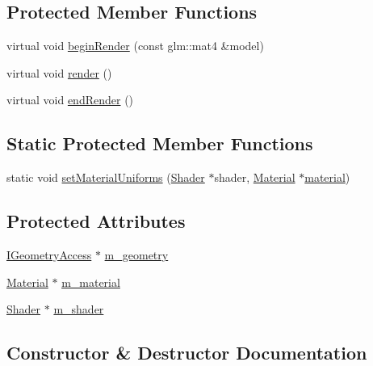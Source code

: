 \subsection*{Protected Member Functions}
\begin{DoxyCompactItemize}
\item 
virtual void \mbox{\hyperlink{classec_1_1_drawable_a9cb72c1eda19a82c849a291e7d45f2b8}{begin\+Render}} (const glm\+::mat4 \&model)
\item 
virtual void \mbox{\hyperlink{classec_1_1_drawable_a7da17eae29c09e49d1a8c2c48e85f88a}{render}} ()
\item 
virtual void \mbox{\hyperlink{classec_1_1_drawable_abf99119cd72054a55d91a7605aa62e32}{end\+Render}} ()
\end{DoxyCompactItemize}
\subsection*{Static Protected Member Functions}
\begin{DoxyCompactItemize}
\item 
static void \mbox{\hyperlink{classec_1_1_drawable_af2b64f8e6faa71bee8cccb14387d8432}{set\+Material\+Uniforms}} (\mbox{\hyperlink{classec_1_1_shader}{Shader}} $\ast$shader, \mbox{\hyperlink{classec_1_1_material}{Material}} $\ast$\mbox{\hyperlink{_resource_type_8h_a16f6cac2c88eef38bdba4f004e042542}{material}})
\end{DoxyCompactItemize}
\subsection*{Protected Attributes}
\begin{DoxyCompactItemize}
\item 
\mbox{\hyperlink{classec_1_1_i_geometry_access}{I\+Geometry\+Access}} $\ast$ \mbox{\hyperlink{classec_1_1_drawable_a12fc649448250ab8a16e862495d22752}{m\+\_\+geometry}}
\item 
\mbox{\hyperlink{classec_1_1_material}{Material}} $\ast$ \mbox{\hyperlink{classec_1_1_drawable_ae95da71e937a2008a84300b8d29ac052}{m\+\_\+material}}
\item 
\mbox{\hyperlink{classec_1_1_shader}{Shader}} $\ast$ \mbox{\hyperlink{classec_1_1_drawable_aee71f07b65189391a7a465d880d744e3}{m\+\_\+shader}}
\end{DoxyCompactItemize}


\subsection{Constructor \& Destructor Documentation}
\mbox{\label{classec_1_1_drawable_adb3c4e7b4d3d510489a26b3d1a8094a2}} 
